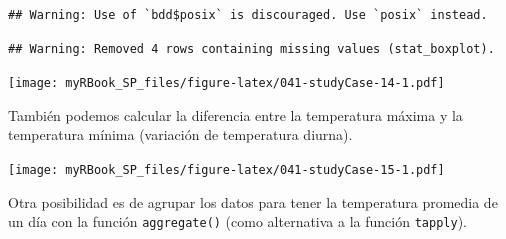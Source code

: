 \documentclass[
]{book}
\newenvironment{Shaded}{\begin{snugshade}}{\end{snugshade}}
\newcommand{\DataTypeTok}[1]{\textcolor[rgb]{0.13,0.29,0.53}{#1}}
\newcommand{\DecValTok}[1]{\textcolor[rgb]{0.00,0.00,0.81}{#1}}
\newcommand{\KeywordTok}[1]{\textcolor[rgb]{0.13,0.29,0.53}{\textbf{#1}}}
\newcommand{\NormalTok}[1]{#1}
\newcommand{\OperatorTok}[1]{\textcolor[rgb]{0.81,0.36,0.00}{\textbf{#1}}}
\newcommand{\StringTok}[1]{\textcolor[rgb]{0.31,0.60,0.02}{#1}}
\begin{document}
\begin{verbatim}
## Warning: Use of `bdd$posix` is discouraged. Use `posix` instead.
\end{verbatim}

\begin{verbatim}
## Warning: Removed 4 rows containing missing values (stat_boxplot).
\end{verbatim}

\texttt{[image: myRBook\_SP\_files/figure-latex/041-studyCase-14-1.pdf]}

También podemos calcular la diferencia entre la temperatura máxima y la temperatura mínima (variación de temperatura diurna).

\begin{Shaded}
\end{Shaded}

\texttt{[image: myRBook\_SP\_files/figure-latex/041-studyCase-15-1.pdf]}

Otra posibilidad es de agrupar los datos para tener la temperatura promedia de un día con la función \texttt{aggregate()} (como alternativa a la función \texttt{tapply}).
\end{document}
